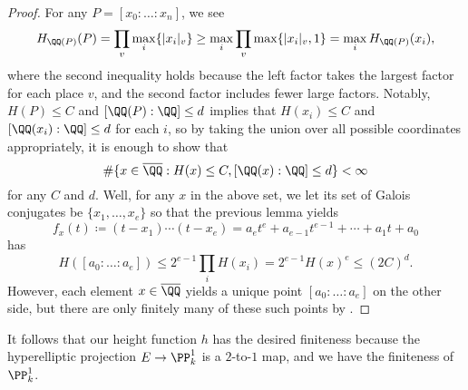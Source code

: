 \documentclass[../notes.tex]{subfiles}
\begin{document}
\begin{proof}
	For any $P=[x_0:\ldots:x_n]$, we see
	\[H_{\QQ(P)}(P)=\prod_v\max_i\{|x_i|_v\}\ge\max_i\prod_v\max\{|x_i|_v,1\}=\max_iH_{\QQ(P)}(x_i),\]
	where the second inequality holds because the left factor takes the largest factor for each place $v$, and the second factor includes fewer large factors. Notably, $H(P)\le C$ and $[\QQ(P):\QQ]\le d$ implies that $H(x_i)\le C$ and $[\QQ(x_i):\QQ]\le d$ for each $i$, so by taking the union over all possible coordinates appropriately, it is enough to show that
	\[\#\{x\in\overline\QQ:H(x)\le C,[\QQ(x):\QQ]\le d\}<\infty\]
	for any $C$ and $d$. Well, for any $x$ in the above set, we let its set of Galois conjugates be $\{x_1,\ldots,x_e\}$ so that the previous lemma yields
	\[f_x(t)\coloneqq(t-x_1)\cdots(t-x_e)=a_et^e+a_{e-1}t^{e-1}+\cdots+a_1t+a_0\]
	has
	\[H([a_0:\ldots:a_e])\le 2^{e-1}\prod_iH(x_i)=2^{e-1}H(x)^e\le(2C)^d.\]
	However, each element $x\in\overline\QQ$ yields a unique point $[a_0:\ldots:a_e]$ on the other side, but there are only finitely many of these such points by .
\end{proof}
It follows that our height function $h$ has the desired finiteness because the hyperelliptic projection $E\to\PP^1_k$ is a $2$-to-$1$ map, and we have the finiteness of $\PP^1_k$.
\end{document}
